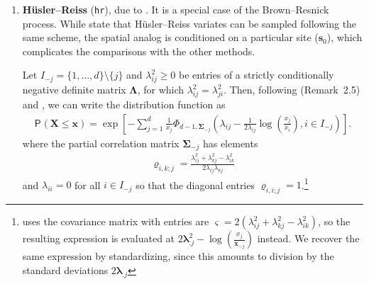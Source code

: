 \documentclass{article}\usepackage[]{graphicx}\usepackage[]{color}
\newcommand{\bs}[1]{\boldsymbol {#1}}
\renewcommand{\P}[2][]{{\mathsf P}_{#1}\left(#2\right)}
\newcommand{\code}[1]{\texttt{#1}}
\newcommand{\pfrac}[2]{\left(\frac{#1}{#2}\right)}
\begin{document}
\begin{enumerate}
\item \textbf{H\"usler--Reiss} (\code{hr}), due to \cite{Husler:1989}. It is a special case of the Brown--Resnick process.
While \cite{Engelke:2015} state that H\"usler--Reiss variates can be sampled following the same scheme, the spatial analog is
conditioned on a particular site ($\bs{s}_0$), which complicates the comparisons with the other methods.

Let $I_{-j}=\{1, \ldots, d\} \setminus \{j\}$ and $\lambda_{ij}^2 \geq 0$ be entries of a strictly conditionally
negative definite matrix $\bs{\Lambda}$, for which $\lambda_{ij}^2=\lambda_{ji}^2$. Then, following \cite{Nikoloulopoulos:2009}
(Remark~2.5) and \cite{Huser:2013}, we can write the distribution function as
 \begin{align*}
   \P{\bs{X} \leq \bs{x}} = \exp \left[ -\sum_{j=1}^d \frac{1}{x_j} \Phi_{d-1, \bs{\Sigma}_{-j}} \left( \lambda_{ij}-
\frac{1}{2\lambda_{ij}}  \log\pfrac{x_j}{x_i}, i \in I_{-j}\right)\right].
                  \end{align*}
                  where the partial correlation matrix $\bs{\Sigma}_{-j}$ has elements
                  \begin{align*}
                     \varrho_{i,k; j}= \frac{\lambda_{ij}^2+\lambda_{kj}^2-\lambda_{ik}^2}{2\lambda_{ij}\lambda_{kj}}
                  \end{align*}
and $\lambda_{ii}=0$ for all $i \in I_{-j}$ so that the diagonal entries $\varrho_{i,i; j}=1$.\footnote{\cite{Engelke:2015}
uses the covariance matrix with entries are $\varsigma=2(\lambda_{ij}^2+\lambda_{kj}^2-\lambda_{ik}^2)$, so the resulting
expression is evaluated at $2\bs{\lambda}_{.j}^2-\log\pfrac{x_j}{\bs{x}_{-j}}$ instead. We recover the same expression by
standardizing, since this amounts to division by the standard deviations $2\bs{\lambda}_{.j}$}




\end{enumerate}
\end{document}
